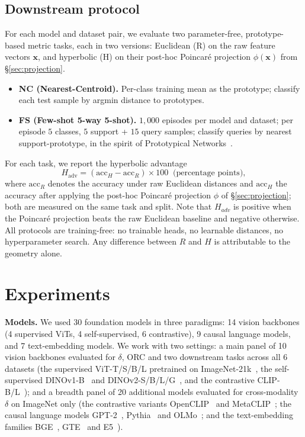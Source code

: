 \documentclass{article}
\begin{document}
\subsection{Downstream protocol}
\label{sec:downstream}

For each model and dataset pair, we evaluate two parameter-free, prototype-based metric tasks, each in two versions: Euclidean (R) on the raw feature vectors $\boldsymbol{x}$, and hyperbolic (H) on their post-hoc Poincar\'{e} projection $\phi(\boldsymbol{x})$ from \S\ref{sec:projection}.
\begin{itemize}[topsep=0pt,itemsep=1pt,leftmargin=*]
\item \textbf{NC (Nearest-Centroid).} Per-class training mean as the prototype; classify each test sample by argmin distance to prototypes.
\item \textbf{FS (Few-shot 5-way 5-shot).} $1{,}000$ episodes per model and dataset; per episode $5$ classes, $5$ support + $15$ query samples; classify queries by nearest support-prototype, in the spirit of Prototypical Networks~\citep{snell2017proto}.
\end{itemize}
For each task, we report the hyperbolic advantage
\begin{equation}
H_\text{adv} = (\mathrm{acc}_H - \mathrm{acc}_R) \times 100 \;\; \text{(percentage points)},
\end{equation}
where $\mathrm{acc}_R$ denotes the accuracy under raw Euclidean distances and $\mathrm{acc}_H$ the accuracy after applying the post-hoc Poincar\'{e} projection $\phi$ of \S\ref{sec:projection}; both are measured on the same task and split.
Note that $H_{adv}$ is positive when the Poincar\'{e} projection beats the raw Euclidean baseline and negative otherwise. All protocols are training-free: no trainable heads, no learnable distances, no hyperparameter search. Any difference between $R$ and $H$ is attributable to the geometry alone.


\section{Experiments}
\label{sec:setup}

\textbf{Models.} We used 30 foundation models in three paradigms: 14 vision backbones (4 supervised ViTs, 4 self-supervised, 6 contrastive), 9 causal language models, and 7 text-embedding models. We work with two settings: a main panel of 10 vision backbones evaluated for $\delta$, ORC and two downstream tasks across all 6 datasets (the supervised ViT-T/S/B/L pretrained on ImageNet-21k~\citep{dosovitskiy2021an}, the self-supervised DINOv1-B~\citep{dinov1} and DINOv2-S/B/L/G~\citep{dinov2}, and the contrastive CLIP-B/L~\citep{CLIP}); and a breadth panel of 20 additional models evaluated for cross-modality $\delta$ on ImageNet only (the contrastive variants OpenCLIP~\citep{openclip} and MetaCLIP~\citep{metaclip}; the causal language models GPT-2~\citep{gpt2}, Pythia~\citep{pythia} and OLMo~\citep{olmo}; and the text-embedding families BGE~\citep{BGE}, GTE~\citep{gte} and E5~\citep{e5}).
\end{document}
